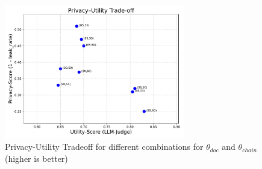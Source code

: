 \begin{figure}[h]
    \centering
    \includegraphics[width=0.7\textwidth]{figures/c3_privacy_utility_tradeoff.pdf}
    \caption{Privacy-Utility Tradeoff for different combinations for  $\theta_{doc}$ and $\theta_{chain}$ (higher is better)}
    \label{approach-fig:privacy_utility_thetas}
\end{figure} 



